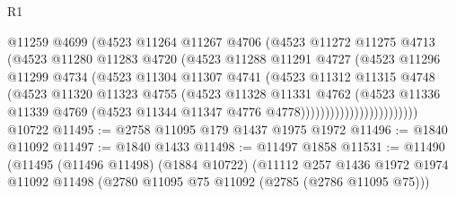 \begin{lexlean}{R1}
\begin{coremodule}
                              @11259
                              @4699
                              (@4523
                                @11264
                                @11267
                                @4706
                                (@4523
                                  @11272
                                  @11275
                                  @4713
                                  (@4523
                                    @11280
                                    @11283
                                    @4720
                                    (@4523
                                      @11288
                                      @11291
                                      @4727
                                      (@4523
                                        @11296
                                        @11299
                                        @4734
                                        (@4523
                                          @11304
                                          @11307
                                          @4741
                                          (@4523
                                            @11312
                                            @11315
                                            @4748
                                            (@4523
                                              @11320
                                              @11323
                                              @4755
                                              (@4523
                                                @11328
                                                @11331
                                                @4762
                                                (@4523
                                                  @11336
                                                  @11339
                                                  @4769
                                                  (@4523
                                                    @11344
                                                    @11347
                                                    @4776
                                                    @4778))))))))))))))))))))))))
    @10722
@11495 := @2758 @11095 @179 @1437 @1975 @1972
@11496 := @1840 @11092
@11497 := @1840 @1433
@11498 := @11497 @1858
@11531 := @11490
    (@11495
      (@11496 @11498)
      (@1884 @10722)
      (@11112
        @257
        @1436
        @1972
        @1974
        @11092
        @11498
        (@2780 @11095 @75 @11092 (@2785 (@2786 @11095 @75)))

\end{coremodule}
\end{lexlean}
